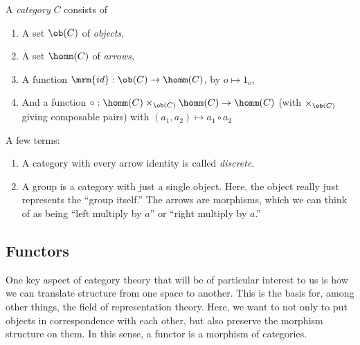 \documentclass{fkbook}
\theoremstyle{snazzydefinition}
\begin{document}
\begin{definition}[Category]
  A \emph{category} $C$ consists of
  \begin{enumerate}[label=\arabic*)]
    \item A set $\ob(C)$ of \emph{objects},
    \item A set $\homm(C)$ of \emph{arrows},
    \item A function $\mrm{id} : \ob(C) \to \homm(C)$, by $o \mapsto
      1_o$,
    \item And a function $\circ : \homm(C) \times_{\ob(C)} \homm(C)
      \to \homm(C)$ (with $\times_{\ob(C)}$ giving composable pairs)
      with $(a_1, a_2) \mapsto a_1 \circ a_2$
  \end{enumerate}
\end{definition}

A few terms:
\begin{enumerate}
  \item A category with every arrow identity is called
    \emph{discrete}.
  \item A group is a category with just a single object. Here, the
    object really just represents the ``group itself.'' The arrows are
    morphisms, which we can think of as being ``left multiply by $a$''
    or ``right multiply by $a$.''
\end{enumerate}

\subsection{Functors}
One key aspect of category theory that will be of particular interest
to us is how we can translate structure from one space to another.
This is the basis for, among other things, the field of representation
theory. Here, we want to not only to put objects in correspondence
with each other, but also preserve the morphism structure on them. In
this sense, a functor is a morphism of categories.
\end{document}

